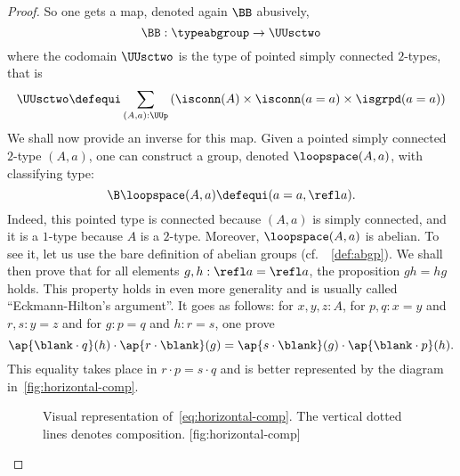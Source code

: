 \begin{proof}
  So one gets a map, denoted again $\BB$ abusively,
  \begin{displaymath}
    \BB : \typeabgroup \to \UUsctwo
  \end{displaymath}
  where the codomain $\UUsctwo$ is the type of pointed simply
  connected $2$-types, that is
  \begin{displaymath}
    \UUsctwo \defequi \sum_{(A,a):\UUp}\left(
      \isconn(A) \times \isconn(a=a) \times \isgrpd(a=a)
    \right)
  \end{displaymath}
  We shall now provide an inverse for this map. Given a pointed simply
  connected $2$-type $(A,a)$, one can construct a group, denoted
  $\loopspace (A,a)$, with classifying type:
  \begin{displaymath}
    \B\loopspace (A,a) \defequi (a=a,\refl a).
  \end{displaymath}
  Indeed, this pointed type is connected because $(A,a)$ is simply
  connected, and it is a $1$-type because $A$ is a $2$-type. Moreover,
  $\loopspace (A,a)$ is abelian. To see it, let us use the bare
  definition of abelian groups (cf.\ ~\cref{def:abgp}). We shall then
  prove that for all elements $g,h:\refl a=\refl a$, the proposition
  $gh=hg$ holds. This property holds in even more generality and is
  usually called ``Eckmann-Hilton's argument''. It goes as follows:
  for $x,y,z:A$, for $p,q:x=y$ and $r,s:y=z$ and for $g:p=q$ and
  $h:r=s$, one prove
  \begin{equation}
    \label{eq:horizontal-comp}%
    \ap{\blank\cdot q}(h) \cdot \ap{r\cdot\blank}(g)
    = \ap{s\cdot \blank}(g) \cdot \ap{\blank\cdot p}(h).
  \end{equation}
  This equality takes place in $r\cdot p = s\cdot q$ and is better
  represented by the diagram in~\cref{fig:horizontal-comp}.
  \begin{figure}[h]
    \begin{sidecaption}
      {%
        Visual representation of~\cref{eq:horizontal-comp}. The vertical
        dotted lines denotes composition.%
      }[fig:horizontal-comp]
      \centering%
\end{sidecaption}
\end{figure}
\end{proof}
